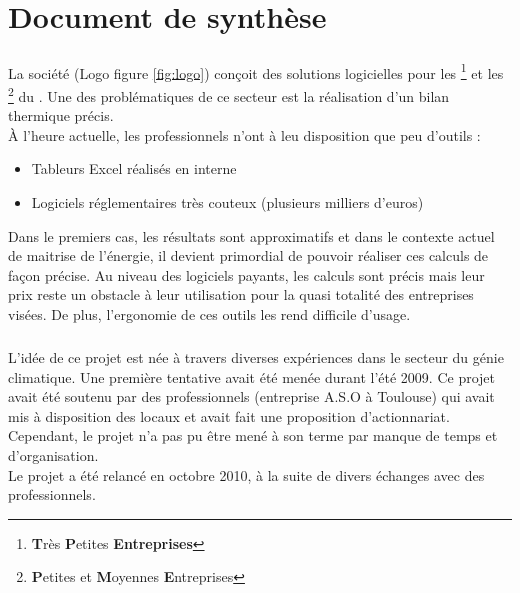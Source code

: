 \chapter*{Document de synthèse}
	\paragraph{}
	La société \K{} (Logo figure \ref{fig:logo}) conçoit des solutions logicielles pour les 
	\footnote{\textbf{T}rès \textbf{P}etites \textbf{Entreprises}} et 
	les \footnote{\textbf{P}etites et \textbf{M}oyennes \textbf{E}ntreprises} du . 
	Une des problématiques de ce secteur est la réalisation d’un bilan thermique précis.\\
	À l'heure actuelle, les professionnels n'ont à leu disposition que peu d'outils :
	\begin{itemize}
		\item Tableurs Excel réalisés en interne
		\item Logiciels réglementaires très couteux (plusieurs milliers d'euros)
	\end{itemize}

	Dans le premiers cas, les résultats sont approximatifs et dans le contexte actuel de maitrise 
	de l'énergie, il devient primordial de pouvoir réaliser ces calculs de façon précise.\newline
	Au niveau des logiciels payants, les calculs sont précis mais leur prix reste un obstacle à 
	leur utilisation pour la quasi totalité des entreprises visées.  De plus, l'ergonomie de ces 
	outils les rend difficile d’usage.

	\paragraph{}
	L'idée de ce projet est née à travers diverses expériences dans le secteur du génie climatique.
	Une première tentative avait été menée durant l'été 2009. Ce projet avait été soutenu par des 
	professionnels (entreprise A.S.O à Toulouse) qui avait mis à disposition des locaux et avait 
	fait une proposition d’actionnariat. Cependant, le projet n’a pas pu être mené à son terme par 
	manque de temps et d’organisation.\\
	Le projet a été relancé en octobre 2010, à la suite de divers échanges avec des professionnels.

